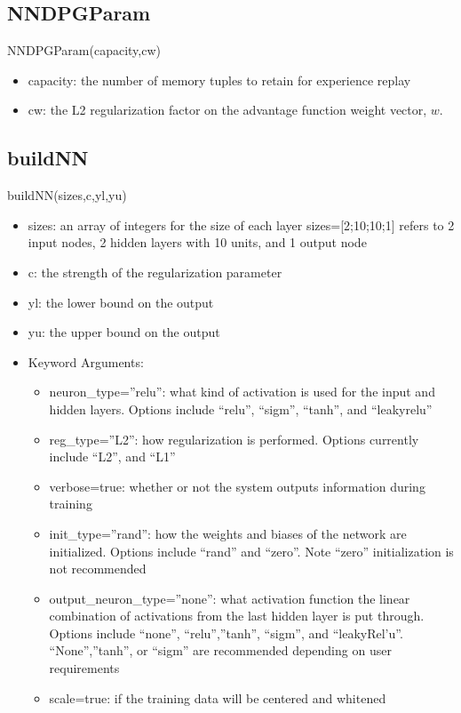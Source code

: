 \documentclass[a4paper]{article}
\begin{document}
\subsection{NNDPGParam}
NNDPGParam(capacity,cw)
\begin{itemize}
\item capacity: the number of memory tuples to retain for experience replay
\item cw: the L2 regularization factor on the advantage function weight vector, $w$.
\end{itemize}

\subsection{buildNN}
buildNN(sizes,c,yl,yu)
\begin{itemize}
\item sizes: an array of integers for the size of each layer sizes=[2;10;10;1] refers to 2 input nodes, 2 hidden layers with 10 units, and 1 output node
\item c: the strength of the regularization parameter
\item yl: the lower bound on the output
\item yu: the upper bound on the output
\item Keyword Arguments:
	\begin{itemize}
	\item neuron\_type=''relu'': what kind of activation is used for the input and hidden layers. Options include ``relu'', ``sigm'', ``tanh'', and ``leakyrelu''
	\item reg\_type=''L2'': how regularization is performed. Options currently include ``L2'', and ``L1''
	\item verbose=true: whether or not the system outputs information during training
	\item init\_type=''rand'': how the weights and biases of the network are initialized. Options include ``rand'' and ``zero''. Note ``zero'' initialization is not recommended
	\item output\_neuron\_type=''none'': what activation function the linear combination of activations from the last hidden layer is put through. Options include ``none'', ``relu'',''tanh'', ``sigm'', and ``leakyRel'u''. ``None'',''tanh'', or ``sigm'' are recommended depending on user requirements
	\item scale=true: if the training data will be centered and whitened
	\end{itemize}
\end{itemize}
\end{document}
